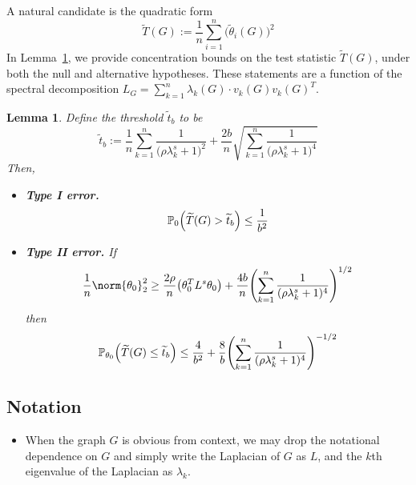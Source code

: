 \documentclass{article}
\newcommand{\1}{\mathbf{1}}
\newcommand{\Lap}{L}
\newcommand{\Pbb}{\mathbb{P}}
\newcommand{\wt}[1]{\widetilde{#1}}
\theoremstyle{alden}
\theoremstyle{aldenthm}
\newtheorem{lemma}{Lemma}
\theoremstyle{definition}
\theoremstyle{remark}
\begin{document}
 A natural candidate is the quadratic form
\begin{equation}
\label{eqn:ls_ts_G}
\wt{T}(G) := \frac{1}{n}\sum_{i = 1}^{n} \bigl(\wt{\theta}_i(G)\bigr)^2
\end{equation}
In Lemma~\ref{lem:ls_fixed_graph_testing}, we provide concentration bounds on the test statistic $\wt{T}(G)$, under both the null and alternative hypotheses. These statements are a function of the spectral decomposition $\Lap_G = \sum_{k = 1}^{n} \lambda_k(G) \cdot v_k(G) v_k(G)^T$. 
\begin{lemma}
	\label{lem:ls_fixed_graph_testing}
	Define the threshold $\wt{t}_b$ to be
	\begin{equation*}
	\wt{t}_b := \frac{1}{n}\sum_{k = 1}^{n} \frac{1}{\bigl(\rho \lambda_k^s + 1\bigr)^2} + \frac{2b}{n}\sqrt{\sum_{k = 1}^{n} \frac{1}{\bigl(\rho \lambda_k^s + 1\bigr)^4}}
	\end{equation*}
	Then,
	\begin{itemize}
		\item \textbf{Type I error.}
		\begin{equation}
		\label{eqn:ls_fixed_graph_testing_typeI}
		\Pbb_0\Bigl(\wt{T}(G) > \wt{t}_b\Bigr) \leq \frac{1}{b^2}
		\end{equation}
		\item \textbf{Type II error.} If
		\begin{equation}
		\label{eqn:ls_fixed_graph_testing_critical_radius}
		\frac{1}{n}\norm{\theta_0}_2^2 \geq \frac{2 \rho}{n} \bigl(\theta_0^T \Lap^s \theta_0\bigr) + \frac{4b}{n} \Biggl(\sum_{k = 1}^{n} \frac{1}{(\rho\lambda_k^s + 1)^4} \Biggr)^{1/2}
		\end{equation}
		then
		\begin{equation}
		\label{eqn:ls_fixed_graph_testing_typeII}
		\Pbb_{\theta_0}\Bigl(\wt{T}(G) \leq \wt{t}_b\Bigr) \leq \frac{4}{b^2} + \frac{8}{b} \Biggl(\sum_{k = 1}^{n} \frac{1}{(\rho\lambda_k^s + 1)^4} \Biggr)^{-1/2}
		\end{equation}
	\end{itemize}
\end{lemma}

\subsection{Notation}
\begin{itemize}
	\item When the graph $G$ is obvious from context, we may drop the notational dependence on $G$ and simply write the Laplacian of $G$ as $\Lap$, and the $k$th eigenvalue of the Laplacian as $\lambda_k$.
\end{itemize}
\end{document}

